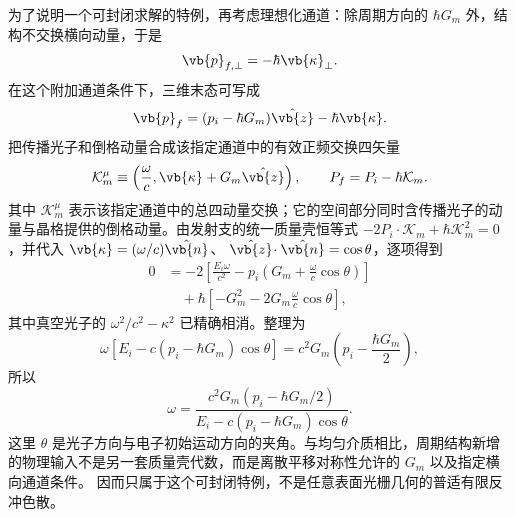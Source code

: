 为了说明一个可封闭求解的特例，再考虑理想化通道：除周期方向的 $\hbar G_m$ 外，结构不交换横向动量，于是
\begin{equation*}
\vb{p}_{f,\perp}=-\hbar\vb{\kappa}_\perp .
\end{equation*}
在这个附加通道条件下，三维末态可写成
\begin{equation*}
\vb{p}_f=(p_i-\hbar G_m)\hat{\vb{z}}-\hbar\vb{\kappa}.
\end{equation*}
把传播光子和倒格动量合成该指定通道中的有效正频交换四矢量
\begin{equation*}
\mathcal K_m^\mu
\equiv
\left(
\frac{\omega}{c},
\vb{\kappa}+G_m\hat{\vb{z}}
\right),
\qquad
P_f=P_i-\hbar\mathcal K_m .
\end{equation*}
其中 $\mathcal K_m^\mu$ 表示该指定通道中的总四动量交换；它的空间部分同时含传播光子的动量与晶格提供的倒格动量。由发射支的统一质量壳恒等式
$-2P_i\!\cdot\mathcal K_m+\hbar\mathcal K_m^2=0$，并代入
$\vb{\kappa}=(\omega/c)\hat{\vb{n}}$、
$\hat{\vb{z}}\!\cdot\hat{\vb{n}}=\cos\theta$，逐项得到
\begin{align*}
0
&=-2\left[
\frac{E_i \omega}{c^2}
-p_i\left(G_m+\frac{\omega}{c}\cos\theta\right)
\right]\\
&\quad
+\hbar\left[
-G_m^2-2G_m\frac{\omega}{c}\cos\theta
\right],
\end{align*}
其中真空光子的 $\omega^2/c^2-\kappa^2$ 已精确相消。整理为
\begin{equation*}
\omega\left[E_i-c(p_i-\hbar G_m)\cos\theta\right]
=c^2G_m\left(p_i-\frac{\hbar G_m}{2}\right),
\end{equation*}
所以
\begin{equation}
{
\omega
=\frac{c^2G_m\left(p_i-\hbar G_m/2\right)}
{E_i-c\left(p_i-\hbar G_m\right)\cos\theta}.}
\label{eq:smith_purcell_exact_recoil_dispersion}
\end{equation}
这里 $\theta$ 是光子方向与电子初始运动方向的夹角。与均匀介质相比，周期结构新增的物理输入不是另一套质量壳代数，而是离散平移对称性允许的 $G_m$ 以及指定横向通道条件。 因而只属于这个可封闭特例，不是任意表面光栅几何的普适有限反冲色散。

